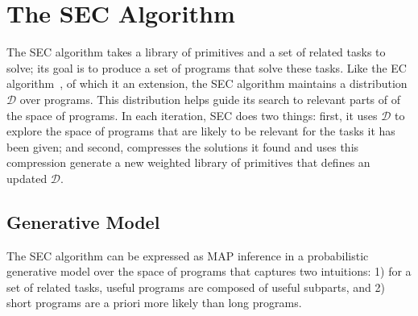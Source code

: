 \documentclass{article} %
\begin{document}



\section{The SEC Algorithm}

The SEC algorithm takes a library of primitives and a set of related tasks to solve; its goal is to produce a set of programs that solve these tasks. Like the EC algorithm~\cite{DBLP:conf/ijcai/DechterMAT13}, of which it an extension, the SEC algorithm maintains a distribution $\mathcal{D}$ over programs. This distribution helps guide its search to relevant parts of of the space of programs. In each iteration, SEC does two things: first, it uses $\mathcal{D}$ to explore the space of programs that are likely to be relevant for the tasks it has been given; and second, compresses the solutions it found and uses this compression generate a new weighted library of primitives that defines an updated $\mathcal{D}$.

\subsection{Generative Model}
The SEC algorithm can be expressed as MAP inference in a probabilistic generative model over the space of programs that captures two intuitions: 1) for a set of related tasks, useful programs are composed of useful subparts, and 2) short programs are a priori more likely than long programs. 
\end{document}
